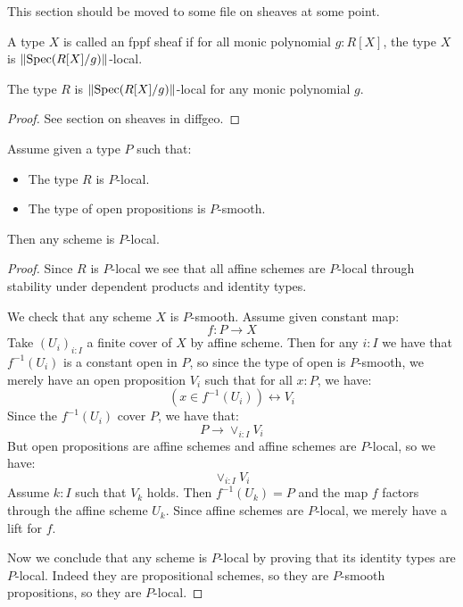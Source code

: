 This section should be moved to some file on sheaves at some point.

\begin{definition}
A type $X$ is called an fppf sheaf if for all monic polynomial $g:R[X]$, the type $X$ is $\lVert \operatorname{Spec}(R[X]/g) \rVert$-local.
\end{definition}

\begin{lemma}\label{fppf-subcanonical}
The type $R$ is $\lVert \operatorname{Spec}(R[X]/g) \rVert$-local for any monic polynomial $g$. 
\end{lemma}

\begin{proof}
See section on sheaves in diffgeo.
\end{proof}

\begin{lemma}\label{scheme-are-sheaf-from-affine}
Assume given a type $P$ such that:
\begin{itemize}
\item The type $R$ is $P$-local.
\item The type of open propositions is $P$-smooth.
\end{itemize}
Then any scheme is $P$-local.
\end{lemma}

\begin{proof}
Since $R$ is $P$-local we see that all affine schemes are $P$-local through stability under dependent products and identity types.

We check that any scheme $X$ is $P$-smooth. Assume given constant map:
\[f:P\to X\]
Take $(U_i)_{i:I}$ a finite cover of $X$ by affine scheme. Then for any $i:I$ we have that $f^{-1}(U_i)$ is a constant open in $P$, so since the type of open is $P$-smooth, we merely have an open proposition $V_i$ such that for all $x:P$, we have:
\[(x\in f^{-1}(U_i) )\leftrightarrow V_i\]
Since the $f^{-1}(U_i)$ cover $P$, we have that:
\[P\to \lor_{i:I} V_i\]
But open propositions are affine schemes and affine schemes are $P$-local, so we have:
\[ \lor_{i:I} V_i\]
Assume $k:I$ such that $V_k$ holds. Then $f^{-1}(U_k) = P$ and the map $f$ factors through the affine scheme $U_k$. Since affine schemes are $P$-local, we merely have a lift for $f$.

Now we conclude that any scheme is $P$-local by proving that its identity types are $P$-local. Indeed they are propositional schemes, so they are $P$-smooth propositions, so they are $P$-local.
\end{proof}

